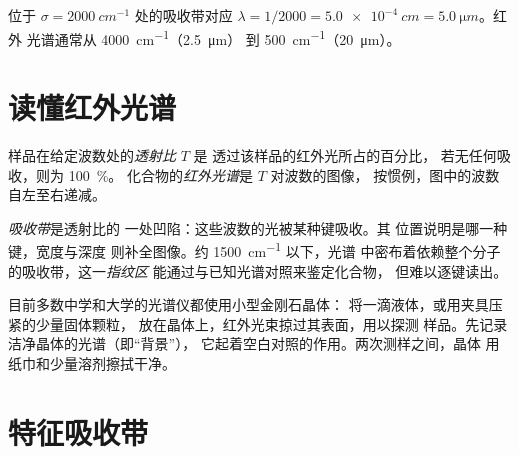\begin{example}[由波数求波长]\label{ex:g11:infrared:convert}
位于 $\sigma = \qty{2000}{cm^{-1}}$ 处的吸收带对应
$\lambda = 1/2000 = \qty{5.0e-4}{cm} = \qty{5.0}{\micro m}$。红外
光谱通常从 \qty{4000}{cm^{-1}}（\qty{2.5}{\micro m}）
到 \qty{500}{cm^{-1}}（\qty{20}{\micro m}）。
\end{example}

\section{读懂红外光谱}

\begin{definition}\label{def:g11:infrared:spectrum}
样品在给定波数处的\emph{透射比} $T$ 是
透过该样品的红外光所占的百分比，
若无任何吸收，则为 \qty{100}{\percent}。
化合物的\emph{红外光谱}是 $T$ 对波数的图像，
按惯例，图中的波数
自左至右递减。
\end{definition}

\begin{definition}\label{def:g11:infrared:band}
\emph{吸收带}是透射比的
一处凹陷：这些波数的光被某种键吸收。其
位置说明是哪一种键，宽度与深度
则补全图像。约 \qty{1500}{cm^{-1}} 以下，光谱
中密布着依赖整个分子的吸收带，这一\emph{指纹区}
能通过与已知光谱对照来鉴定化合物，
但难以逐键读出。
\end{definition}

\begin{inthelab}[记录光谱]
目前多数中学和大学的光谱仪都使用小型金刚石晶体：
将一滴液体，或用夹具压紧的少量固体颗粒，
放在晶体上，红外光束掠过其表面，用以探测
样品。先记录洁净晶体的光谱（即“背景”），
它起着空白对照的作用。两次测样之间，晶体
用纸巾和少量溶剂擦拭干净。
\end{inthelab}

\section{特征吸收带}

